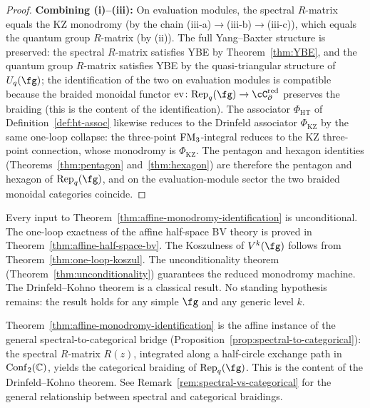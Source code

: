 \begin{proof}
\smallskip\noindent
\textbf{Combining (i)--(iii):} On evaluation modules, the
spectral $R$-matrix equals the KZ monodromy (by the chain
(iii-a)$\to$(iii-b)$\to$(iii-c)), which equals the quantum group
$R$-matrix (by (ii)). The full Yang--Baxter structure is preserved:
the spectral $R$-matrix satisfies YBE by
Theorem~\ref{thm:YBE}, and the quantum group $R$-matrix satisfies
YBE by the quasi-triangular structure of $U_q(\fg)$; the
identification of the two on evaluation modules is compatible
because the braided monoidal functor
$\mathrm{ev} \colon \mathrm{Rep}_q(\fg) \to \cC_\partial^{\mathrm{red}}$
preserves the braiding (this is the content of the identification).
The associator $\Phi_{\mathrm{HT}}$ of
Definition~\ref{def:ht-assoc} likewise reduces to the Drinfeld
associator $\Phi_{\mathrm{KZ}}$ by the same one-loop collapse:
the three-point $\mathrm{FM}_3$-integral reduces to the KZ three-point
connection, whose monodromy is $\Phi_{\mathrm{KZ}}$. The pentagon
and hexagon identities
(Theorems~\ref{thm:pentagon} and~\ref{thm:hexagon}) are therefore
the pentagon and hexagon of $\mathrm{Rep}_q(\fg)$, and on the
evaluation-module sector the two braided monoidal categories
coincide.
\end{proof}

\begin{remark}
\label{rem:affine-unconditional}
Every input to Theorem~\ref{thm:affine-monodromy-identification} is unconditional. The one-loop exactness of the affine half-space BV theory is proved in Theorem~\ref{thm:affine-half-space-bv}. The Koszulness of $V^k(\fg)$ follows from Theorem~\ref{thm:one-loop-koszul}. The unconditionality theorem (Theorem~\ref{thm:unconditionality}) guarantees the reduced monodromy machine. The Drinfeld--Kohno theorem is a classical result. No standing hypothesis remains: the result holds for any simple $\fg$ and any generic level $k$.
\end{remark}

\begin{remark}
\label{rem:spectral-categorical-crossref}
Theorem~\ref{thm:affine-monodromy-identification} is the affine instance of the general spectral-to-categorical bridge (Proposition~\ref{prop:spectral-to-categorical}): the spectral $R$-matrix $R(z)$, integrated along a half-circle exchange path in $\mathrm{Conf}_2(\mathbb C)$, yields the categorical braiding of $\mathrm{Rep}_q(\fg)$. This is the content of the Drinfeld--Kohno theorem. See Remark~\ref{rem:spectral-vs-categorical} for the general relationship between spectral and categorical braidings.
\end{remark}

